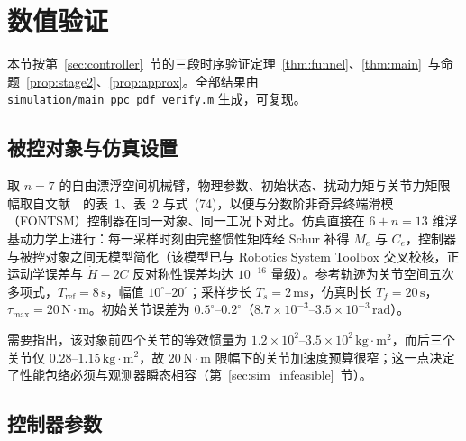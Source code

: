 \section{数值验证}
\label{sec:simulation}

本节按第~\ref{sec:controller}~节的三段时序验证定理~\ref{thm:funnel}、\ref{thm:main}~与命题~\ref{prop:stage2}、\ref{prop:approx}。全部结果由 \texttt{simulation/main\_ppc\_pdf\_verify.m} 生成，可复现。

\subsection{被控对象与仿真设置}
\label{sec:sim_model}

取 \(n=7\) 的自由漂浮空间机械臂，物理参数、初始状态、扰动力矩与关节力矩限幅取自文献~\cite{dou2025fractional}~的表~1、表~2 与式~(74)，以便与分数阶非奇异终端滑模（FONTSM）控制器在同一对象、同一工况下对比。仿真直接在 \(6+n=13\) 维浮基动力学上进行：每一采样时刻由完整惯性矩阵经 Schur 补得 \(M_e\) 与 \(C_e\)，控制器与被控对象之间无模型简化（该模型已与 Robotics System Toolbox 交叉校核，正运动学误差与 \(\dot H-2C\) 反对称性误差均达 \(10^{-16}\) 量级）。参考轨迹为关节空间五次多项式，\(T_{\mathrm{ref}}=8\,\mathrm s\)，幅值 \(10^{\circ}\)--\(20^{\circ}\)；采样步长 \(T_s=2\,\mathrm{ms}\)，仿真时长 \(T_f=20\,\mathrm s\)，\(\tau_{\max}=20\,\mathrm{N\cdot m}\)。初始关节误差为 \(0.5^{\circ}\)--\(0.2^{\circ}\)（\(8.7\times10^{-3}\)--\(3.5\times10^{-3}\,\mathrm{rad}\)）。

需要指出，该对象前四个关节的等效惯量为 \(1.2\times10^{2}\)--\(3.5\times10^{2}\,\mathrm{kg\cdot m^2}\)，而后三个关节仅 \(0.28\)--\(1.15\,\mathrm{kg\cdot m^2}\)，故 \(20\,\mathrm{N\cdot m}\) 限幅下的关节加速度预算很窄；这一点决定了性能包络必须与观测器瞬态相容（第~\ref{sec:sim_infeasible}~节）。

\subsection{控制器参数}
\label{sec:sim_params}

